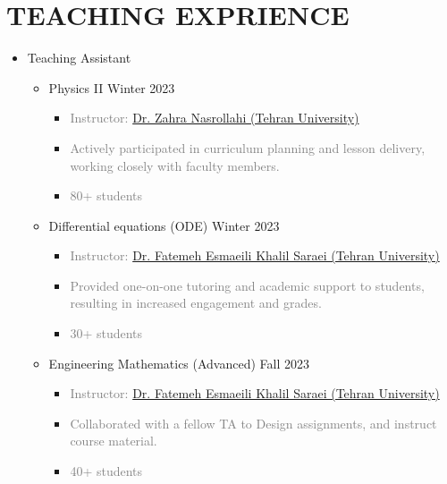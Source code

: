 \documentclass[11pt,letter,sans]{moderncv} %
\newcommand*{\authorimg}[1]{%
	\raisebox{-.25\baselineskip}{%
		\texttt{[image: \#1]}%
	}%
}
\begin{document}
\section{TEACHING EXPRIENCE}
    \begin{itemize}
	\item Teaching Assistant
		\begin{itemize}	
			\item \authorimg{Images/TehranUni.jpg} Physics II \hfill Winter 2023
    			\begin{itemize} 
    				\item\textcolor{gray}{Instructor: \href{https://profile.ut.ac.ir/en/~z.nasr}{Dr. Zahra Nasrollahi (Tehran University)}}
                        \item\textcolor{gray} {Actively participated in curriculum planning and lesson delivery, working closely with faculty members.}
                        \vspace{0.2em}
                        \item\textcolor{gray}{80+ students}
    			\end{itemize}
       
			\item \authorimg{Images/TehranUni.jpg} Differential equations (ODE) \hfill Winter 2023
    			\begin{itemize}
    				\item \textcolor{gray}{Instructor: \href{https://profile.ut.ac.ir/en/~f.esmaeili.kh}{Dr. Fatemeh Esmaeili Khalil Saraei  (Tehran University)}}
                        \item\textcolor{gray} {Provided one-on-one tutoring and academic support to students, resulting in increased engagement and grades.}
                        \vspace{0.2em}
                        \item\textcolor{gray}{30+ students}
    			\end{itemize}

			\item \authorimg{Images/TehranUni.jpg} Engineering Mathematics (Advanced) \hfill Fall 2023
    			\begin{itemize} 
    				\item \textcolor{gray}{Instructor: \href{https://profile.ut.ac.ir/en/~f.esmaeili.kh}{Dr. Fatemeh Esmaeili Khalil Saraei  (Tehran University)}}
                        \item\textcolor{gray} {Collaborated with a fellow TA to Design assignments, and instruct course material.}
                        \item\textcolor{gray}{40+ students}
    			\end{itemize}
		\end{itemize}
    \end{itemize}
\end{document}

